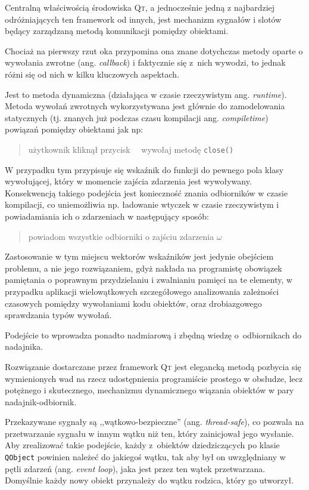 Centralną właściwością środowiska \textsc{Qt}, a jednocześnie jedną z najbardziej odróżniających ten framework od innych, jest mechanizm sygnałów i slotów będący zarządzaną metodą komunikacji pomiędzy obiektami.

Chociaż na pierwszy rzut oka przypomina ona znane dotychczas metody oparte o wywołania zwrotne (ang. \textsl{callback}) i faktycznie się z~nich wywodzi, to jednak różni się od nich w kilku kluczowych aspektach.

Jest to metoda dynamiczna (działająca w czasie rzeczywistym \ppauza ang. \textsl{runtime}). Metoda wywołań zwrotnych wykorzystywana jest głównie do zamodelowania statycznych (tj. znanych już podczas czasu kompilacji \ppauza ang. \textsl{compiletime}) powiązań pomiędzy obiektami jak np:
\begin{verse}
użytkownik kliknął przycisk \texttimes~\textrightarrow~wywołaj metodę \texttt{close()}
\end{verse}

W przypadku tym przypisuje się wskaźnik do funkcji do pewnego pola klasy wywołującej, który w momencie zajścia zdarzenia jest wywoływany. Konsekwencją takiego podejścia jest konieczność znania odbiorników w czasie kompilacji, co uniemożliwia np. ładowanie wtyczek w czasie rzeczywistym i powiadamiania ich o zdarzeniach w następujący sposób:
\begin{verse}
powiadom wszystkie odbiorniki o zajściu zdarzenia $\omega$
\end{verse}

Zastosowanie w tym miejscu wektorów wskaźników jest jedynie obejściem problemu, a nie jego rozwiązaniem, gdyż nakłada na programistę obowiązek pamiętania o poprawnym przydzielaniu i zwalnianiu pamięci na te elementy, w przypadku aplikacji wielowątkowych szczegółowego analizowania zależności czasowych pomiędzy wywołaniami kodu obiektów, oraz drobiazgowego sprawdzania typów wywołań.

Podejście to wprowadza ponadto nadmiarową i zbędną wiedzę o~odbiornikach do nadajnika.

Rozwiązanie dostarczane przez framework \textsc{Qt} jest elegancką metodą pozbycia się wymienionych wad na rzecz udostępnienia programiście prostego w obsłudze, lecz potężnego i skutecznego, mechanizmu dynamicznego wiązania obiektów w pary nadajnik-odbiornik.

Przekazywane sygnały są ,,wątkowo-bezpieczne'' (ang. \textsl{thread-safe}), co pozwala na przetwarzanie sygnału w innym wątku niż ten, który zainicjował jego wysłanie. Aby zrealizować takie podejście, każdy z~obiektów dziedziczących po klasie \verb|QObject| powinien należeć do jakiegoś wątku, tak aby był on uwzględniany w pętli zdarzeń (ang. \textsl{event loop}), jaka jest przez ten wątek przetwarzana. Domyślnie każdy nowy obiekt przynależy do wątku rodzica, który go utworzył.

